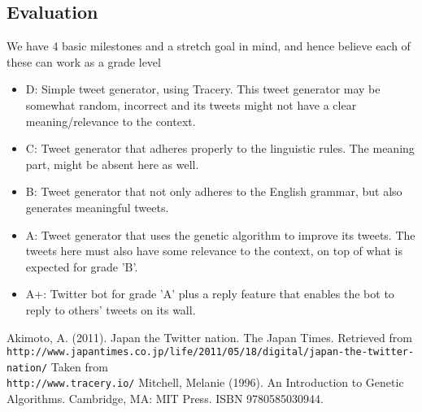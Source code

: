 \documentclass[11pt]{article}
\begin{document}
        \subsection{Evaluation}
        We have 4 basic milestones and a stretch goal in mind, and hence believe each of these can work as a grade level
        \begin{itemize}
            \item D: Simple tweet generator, using Tracery. This tweet generator may be somewhat random, incorrect and its tweets might not have a clear meaning/relevance to the context.
            \item C: Tweet generator that adheres properly to the linguistic rules. The meaning part, might be absent here as well.
            \item B: Tweet generator that not only adheres to the English grammar, but also generates meaningful tweets.
            \item A: Tweet generator that uses the genetic algorithm to improve its tweets. The tweets here must also have some relevance to the context, on top of what is expected for grade 'B'.
            \item A+: Twitter bot for grade 'A' plus a reply feature that enables the bot to reply to others' tweets on its wall.
        \end{itemize}
        
        \begin{thebibliography}{9}
            Akimoto, A. (2011). Japan the Twitter nation. The Japan Times. Retrieved from \\\texttt{http://www.japantimes.co.jp/life/2011/05/18/digital/japan-the-twitter-nation/}
            Taken from \\\texttt{http://www.tracery.io/}
            Mitchell, Melanie (1996). An Introduction to Genetic Algorithms. Cambridge, MA: MIT Press. ISBN 9780585030944.
        \end{thebibliography}
\end{document}
